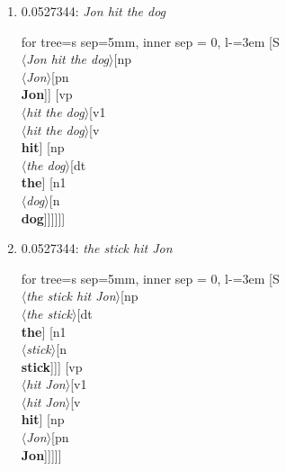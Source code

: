 \documentclass[11pt]{article}
\begin{document}
\begin{enumerate}
	\item  0.0527344: \textit{Jon hit the dog} \\[0.5em]
	\begin{adjustbox}{max width = \textwidth}
	\begin{forest}
	for tree={s sep=5mm, inner sep = 0, l-=3em}
	[S\\$\langle$\textit{Jon hit the dog}$\rangle$[np\\$\langle$\textit{Jon}$\rangle$[pn\\\textbf{Jon}]] [vp\\$\langle$\textit{hit the dog}$\rangle$[v1\\$\langle$\textit{hit the dog}$\rangle$[v\\\textbf{hit}] [np\\$\langle$\textit{the dog}$\rangle$[dt\\\textbf{the}] [n1\\$\langle$\textit{dog}$\rangle$[n\\\textbf{dog}]]]]]]
	\end{forest}
	\end{adjustbox}
	\newpage

	\item  0.0527344: \textit{the stick hit Jon} \\[0.5em]
	\begin{adjustbox}{max width = \textwidth}
	\begin{forest}
	for tree={s sep=5mm, inner sep = 0, l-=3em}
	[S\\$\langle$\textit{the stick hit Jon}$\rangle$[np\\$\langle$\textit{the stick}$\rangle$[dt\\\textbf{the}] [n1\\$\langle$\textit{stick}$\rangle$[n\\\textbf{stick}]]] [vp\\$\langle$\textit{hit Jon}$\rangle$[v1\\$\langle$\textit{hit Jon}$\rangle$[v\\\textbf{hit}] [np\\$\langle$\textit{Jon}$\rangle$[pn\\\textbf{Jon}]]]]]
	\end{forest}
	\end{adjustbox}
	\newpage


\end{enumerate}
\end{document}
